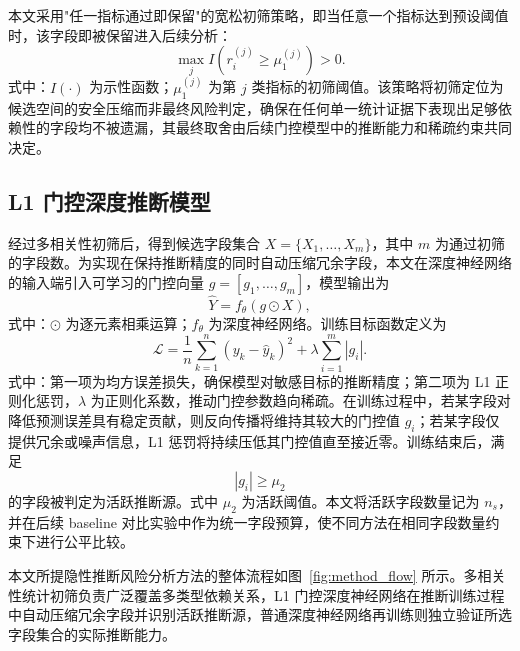 \documentclass[UTF8,zihao=5,twoside]{ctexart}
\numberwithin{equation}{section}
\begin{document}
本文采用"任一指标通过即保留"的宽松初筛策略，即当任意一个指标达到预设阈值时，该字段即被保留进入后续分析：
\begin{equation}
\max_j I\left(r_i^{(j)}\geq \mu_1^{(j)}\right)>0.
\end{equation}
式中：$I(\cdot)$ 为示性函数；$\mu_1^{(j)}$ 为第 $j$ 类指标的初筛阈值。该策略将初筛定位为候选空间的安全压缩而非最终风险判定，确保在任何单一统计证据下表现出足够依赖性的字段均不被遗漏，其最终取舍由后续门控模型中的推断能力和稀疏约束共同决定。

\subsection{L1 门控深度推断模型}
经过多相关性初筛后，得到候选字段集合 $X=\{X_1,\ldots,X_m\}$，其中 $m$ 为通过初筛的字段数。为实现在保持推断精度的同时自动压缩冗余字段，本文在深度神经网络的输入端引入可学习的门控向量 $g=[g_1,\ldots,g_m]$，模型输出为
\begin{equation}
\hat{Y}=f_{\theta}(g\odot X),
\end{equation}
式中：$\odot$ 为逐元素相乘运算；$f_{\theta}$ 为深度神经网络。训练目标函数定义为
\begin{equation}
\mathcal{L}=\frac{1}{n}\sum_{k=1}^{n}(y_k-\hat{y}_k)^2+\lambda\sum_{i=1}^{m}|g_i|.
\end{equation}
式中：第一项为均方误差损失，确保模型对敏感目标的推断精度；第二项为 L1 正则化惩罚，$\lambda$ 为正则化系数，推动门控参数趋向稀疏。在训练过程中，若某字段对降低预测误差具有稳定贡献，则反向传播将维持其较大的门控值 $g_i$；若某字段仅提供冗余或噪声信息，L1 惩罚将持续压低其门控值直至接近零。训练结束后，满足
\begin{equation}
|g_i|\geq \mu_2
\end{equation}
的字段被判定为活跃推断源。式中 $\mu_2$ 为活跃阈值。本文将活跃字段数量记为 $n_s$，并在后续 baseline 对比实验中作为统一字段预算，使不同方法在相同字段数量约束下进行公平比较。

本文所提隐性推断风险分析方法的整体流程如图~\ref{fig:method_flow} 所示。多相关性统计初筛负责广泛覆盖多类型依赖关系，L1 门控深度神经网络在推断训练过程中自动压缩冗余字段并识别活跃推断源，普通深度神经网络再训练则独立验证所选字段集合的实际推断能力。
\end{document}
